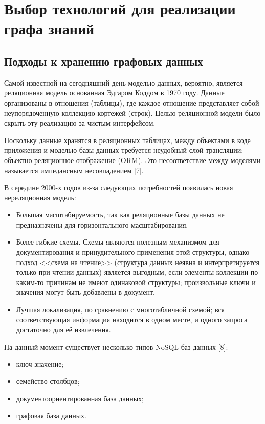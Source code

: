 \chapter{Выбор технологий для реализации графа знаний} \label{ch2}


\section{Подходы к хранению графовых данных}

Самой известной на сегодняшний день моделью данных, вероятно, является реляционная модель основанная Эдгаром Коддом в 1970 году. Данные
организованы в отношения (таблицы), где каждое отношение представляет собой неупорядоченную коллекцию кортежей (строк). Целью реляционной
модели было скрыть эту реализацию за чистым интерфейсом.

Поскольку данные хранятся в реляционных таблицах, между объектами в коде приложения и моделью базы данных требуется неудобный слой
трансляции: объектно-реляционное отображение (ORM). Это несоответствие между моделями называется импедансным несовпадением [7].

В середине 2000-х годов из-за следующих потребностей появилась новая нереляционная модель:

\begin{itemize}
    \item Большая масштабируемость, так как реляционные базы данных не предназначены для горизонтального масштабирования.
    \item Более гибкие схемы. Схемы являются полезным механизмом для документирования и принудительного применения этой структуры, однако подход <<схема на чтение>> (структура данных неявна и интерпретируется только при чтении данных) является выгодным, если элементы коллекции по каким-то причинам не имеют одинаковой структуры; произвольные ключи и значения могут быть добавлены в документ.
    \item Лучшая локализация, по сравнению с многотабличной схемой; вся соответствующая информация находится в одном месте, и одного запроса достаточно для её извлечения.
\end{itemize}

На данный момент существует несколько типов NoSQL баз данных [8]:

\begin{itemize}
    \item ключ значение;
    \item семейство столбцов;
    \item документоориентированная база данных;
    \item графовая база данных.
\end{itemize}


